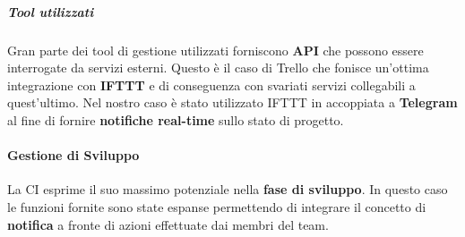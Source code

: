 \subparagraph{Tool utilizzati}
Gran parte dei tool di gestione utilizzati forniscono \textbf{API} che possono essere interrogate da servizi esterni. Questo è il caso di Trello che fonisce un'ottima integrazione con \textbf{IFTTT} e di conseguenza con svariati servizi collegabili a quest'ultimo. Nel nostro caso è stato utilizzato IFTTT in accoppiata a \textbf{Telegram} al fine di fornire \textbf{notifiche real-time} sullo stato di progetto.


\paragraph{Gestione di Sviluppo}
La CI esprime il suo massimo potenziale nella \textbf{fase di sviluppo}. In questo caso le funzioni fornite sono state espanse permettendo di integrare il concetto di \textbf{notifica} a fronte di azioni effettuate dai membri del team.

